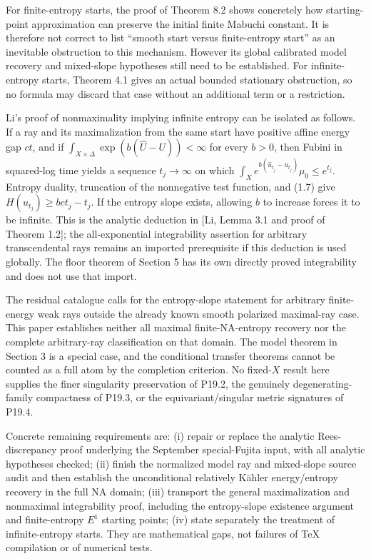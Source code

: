 \documentclass[
  11pt,
]{article}
\begin{document}
For finite-entropy starts, the proof of Theorem 8.2 shows concretely how
starting-point approximation can preserve the initial finite Mabuchi
constant. It is therefore not correct to list ``smooth start versus
finite-entropy start'' as an inevitable obstruction to this mechanism.
However its global calibrated model recovery and mixed-slope hypotheses
still need to be established. For infinite-entropy starts, Theorem 4.1
gives an actual bounded stationary obstruction, so no formula may
discard that case without an additional term or a restriction.

Li's proof of nonmaximality implying infinite entropy can be isolated as
follows. If a ray and its maximalization from the same start have
positive affine energy gap \(ct\), and if
\(\int_{X\times\Delta}\exp(b(\widehat U-U))<\infty\) for every \(b>0\),
then Fubini in squared-log time yields a sequence \(t_j\to\infty\) on
which \(\int_Xe^{b(\widehat u_{t_j}-u_{t_j})}\mu_0\leq e^{t_j}\).
Entropy duality, truncation of the nonnegative test function, and (1.7)
give \(H(u_{t_j})\geq bct_j-t_j\). If the entropy slope exists, allowing
\(b\) to increase forces it to be infinite. This is the analytic
deduction in {[}Li, Lemma 3.1 and proof of Theorem 1.2{]}; the
all-exponential integrability assertion for arbitrary transcendental
rays remains an imported prerequisite if this deduction is used
globally. The floor theorem of Section 5 has its own directly proved
integrability and does not use that import.

The residual catalogue calls for the entropy-slope statement for
arbitrary finite-energy weak rays outside the already known smooth
polarized maximal-ray case. This paper establishes neither all maximal
finite-NA-entropy recovery nor the complete arbitrary-ray classification
on that domain. The model theorem in Section 3 is a special case, and
the conditional transfer theorems cannot be counted as a full atom by
the completion criterion. No fixed-\(X\) result here supplies the finer
singularity preservation of P19.2, the genuinely degenerating-family
compactness of P19.3, or the equivariant/singular metric signatures of
P19.4.

Concrete remaining requirements are: (i) repair or replace the analytic
Rees-discrepancy proof underlying the September special-Fujita input,
with all analytic hypotheses checked; (ii) finish the normalized model
ray and mixed-slope source audit and then establish the unconditional
relatively Kähler energy/entropy recovery in the full NA domain; (iii)
transport the general maximalization and nonmaximal integrability proof,
including the entropy-slope existence argument and finite-entropy
\(E^1\) starting points; (iv) state separately the treatment of
infinite-entropy starts. They are mathematical gaps, not failures of TeX
compilation or of numerical tests.
\end{document}
